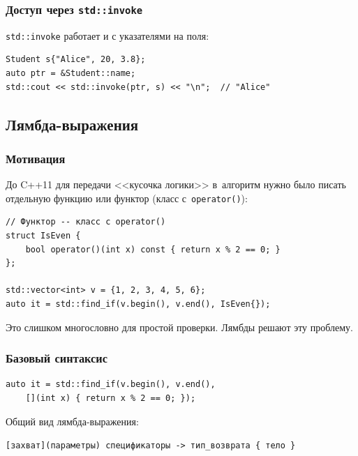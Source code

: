 \documentclass[a4paper,12pt]{article}
\begin{document}
\subsubsection{Доступ через \texttt{std::invoke}}

\texttt{std::invoke} работает и с указателями на поля:

\begin{lstlisting}
Student s{"Alice", 20, 3.8};
auto ptr = &Student::name;
std::cout << std::invoke(ptr, s) << "\n";  // "Alice"
\end{lstlisting}

\subsection{Лямбда-выражения}

\subsubsection{Мотивация}

До C++11 для передачи <<кусочка логики>> в~алгоритм нужно было писать
отдельную функцию или функтор (класс с~\texttt{operator()}):

\begin{lstlisting}
// Функтор -- класс с operator()
struct IsEven {
    bool operator()(int x) const { return x % 2 == 0; }
};

std::vector<int> v = {1, 2, 3, 4, 5, 6};
auto it = std::find_if(v.begin(), v.end(), IsEven{});
\end{lstlisting}

Это слишком многословно для простой проверки. Лямбды решают эту проблему.

\subsubsection{Базовый синтаксис}

\begin{lstlisting}
auto it = std::find_if(v.begin(), v.end(),
    [](int x) { return x % 2 == 0; });
\end{lstlisting}

Общий вид лямбда-выражения:

\begin{center}
\texttt{[захват](параметры) спецификаторы -> тип\_возврата \{ тело \}}
\end{center}
\end{document}
